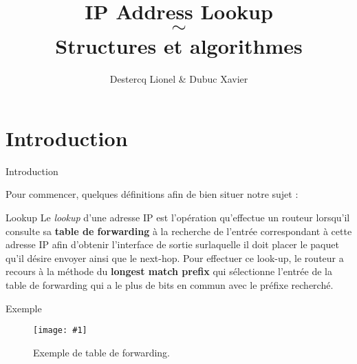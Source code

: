 \documentclass{beamer}
\title[IP Address Lookup]{IP Address Lookup \\ $\sim$ \\ Structures et algorithmes}
\author{Destercq Lionel \& Dubuc Xavier}
\institute{\imageR{UMONS.jpg}{100}}
\newcommand{\imageR}[2]{\texttt{[image: \#1]}}
\newcommand{\term}[1]{\textit{\textcolor{maintitle}{#1}}}
\begin{document}


\begin{frame}
\titlepage
\end{frame}


\section{Introduction}

\begin{frame}{Introduction}

Pour commencer, quelques définitions afin de bien situer notre sujet :

\begin{block}{Lookup}
Le \term{lookup} d'une adresse IP est l'opération qu'effectue un routeur lorsqu'il consulte sa \textbf{table de forwarding} à la
recherche de l'entrée correspondant à cette adresse IP afin d'obtenir l'interface de sortie surlaquelle il doit placer le paquet
qu'il désire envoyer ainsi que le next-hop. Pour effectuer ce look-up, le routeur a recours à la méthode du \textbf{longest match 
prefix} qui sélectionne l'entrée de la table de forwarding qui a le plus de bits en commun avec le préfixe recherché.
\end{block}

\end{frame}

\begin{frame}{Exemple}
\begin{figure}
	\begin{center}
	\imageR{CN_001.png}{200}
	\caption{Exemple de table de forwarding.}
	\end{center}	
\end{figure}
\end{frame}
\end{document}
